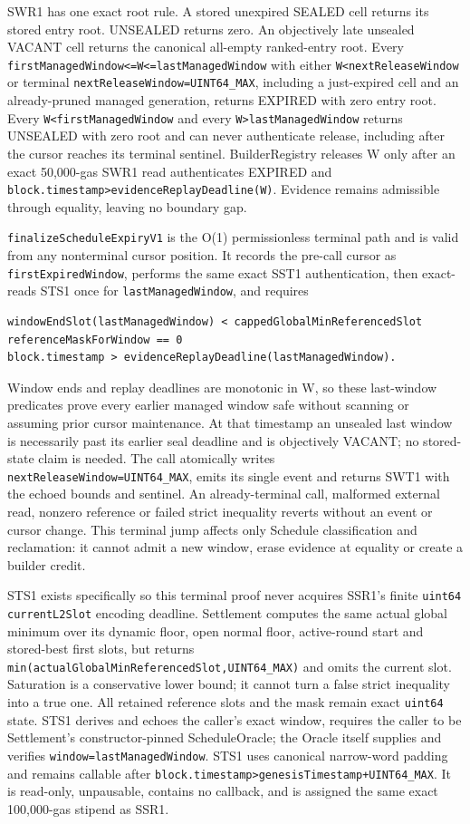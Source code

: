 \documentclass[a4paper,11pt]{article}
\newcommand{\code}[1]{\nolinkurl{#1}}
\begin{document}
SWR1 has one exact root rule.  A stored unexpired SEALED cell returns its stored
entry root.  UNSEALED returns zero.  An objectively late unsealed VACANT cell
returns the canonical all-empty ranked-entry root.  Every
\code{firstManagedWindow<=W<=lastManagedWindow} with either
\code{W<nextReleaseWindow} or terminal \code{nextReleaseWindow=UINT64_MAX},
including a just-expired cell and an already-pruned managed generation, returns
EXPIRED with zero entry root.
Every \code{W<firstManagedWindow} and every
\code{W>lastManagedWindow} returns UNSEALED with zero root and can
never authenticate release, including after the cursor reaches its terminal
sentinel.  BuilderRegistry releases W
only after an exact 50,000-gas SWR1 read authenticates EXPIRED and
\code{block.timestamp>evidenceReplayDeadline(W)}.  Evidence remains admissible
through equality, leaving no boundary gap.

\code{finalizeScheduleExpiryV1} is the O(1) permissionless terminal path and
is valid from any nonterminal cursor position.  It records the pre-call cursor
as \code{firstExpiredWindow}, performs the same exact SST1 authentication,
then exact-reads STS1 once for
\code{lastManagedWindow}, and requires
\begin{verbatim}
windowEndSlot(lastManagedWindow) < cappedGlobalMinReferencedSlot
referenceMaskForWindow == 0
block.timestamp > evidenceReplayDeadline(lastManagedWindow).
\end{verbatim}
Window
ends and replay deadlines are monotonic in W, so these last-window predicates
prove every earlier managed window safe without scanning or assuming prior
cursor maintenance.  At that timestamp an unsealed last window is necessarily
past its earlier seal deadline and is objectively VACANT; no stored-state claim
is needed.  The call atomically writes \code{nextReleaseWindow=UINT64_MAX},
emits its single event and returns SWT1 with the echoed bounds and sentinel.
An already-terminal call, malformed external read, nonzero reference or failed
strict inequality reverts without an event or cursor change.  This terminal
jump affects only Schedule classification and reclamation: it cannot admit a
new window, erase evidence at equality or create a builder credit.

STS1 exists specifically so this terminal proof never acquires SSR1's finite
\code{uint64 currentL2Slot} encoding deadline.  Settlement computes the same
actual global minimum over its dynamic floor, open normal floor, active-round
start and stored-best first slots, but returns
\code{min(actualGlobalMinReferencedSlot,UINT64_MAX)} and omits the current
slot.  Saturation is a conservative lower bound; it cannot turn a false strict
inequality into a true one.  All retained reference slots and the mask remain
exact \code{uint64} state.  STS1 derives and echoes the caller's exact window,
requires the caller to be Settlement's constructor-pinned ScheduleOracle; the
Oracle itself supplies and verifies \code{window=lastManagedWindow}.  STS1 uses
canonical narrow-word padding and remains callable after
\code{block.timestamp>genesisTimestamp+UINT64_MAX}.  It is read-only,
unpausable, contains no callback, and is assigned the same exact 100,000-gas
stipend as SSR1.
\end{document}

